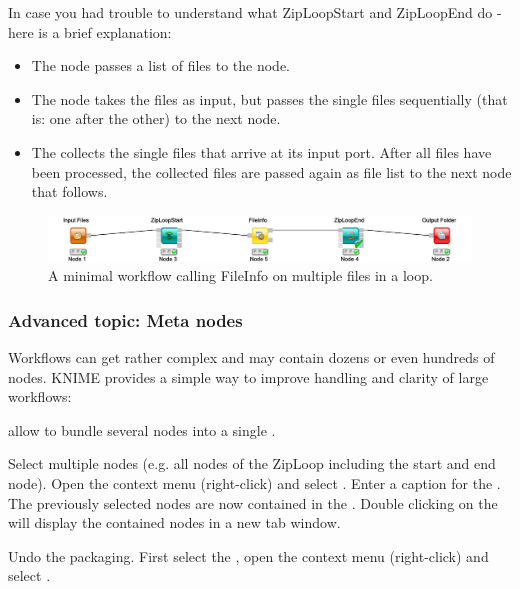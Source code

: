 In case you had trouble to understand what ZipLoopStart and ZipLoopEnd do - here is a brief explanation:
\begin{itemize}
\item
The   node passes a list of files to the  node.
\item
The  node takes the files as input, but passes the single files sequentially (that is: one after the other) to the next node. 
\item
The  collects the single files that arrive at its input port. After all files have been processed, the collected files are passed again as file list to the next node that follows.
\end{itemize}

\begin{figure}
\centering
\includegraphics[width=\textwidth]{graphics/knime_setup/Minimal_FileInfoLoop}
\caption{A minimal workflow calling FileInfo on multiple files in a loop.}
\label{fig:knime_minimal_loop}
\end{figure}

\subsubsection{Advanced topic: Meta nodes}

Workflows can get rather complex and may contain dozens or even hundreds of nodes. KNIME provides a simple way to improve handling and clarity of large workflows:

 allow to bundle several nodes into a single .

\begin{task}
Select multiple nodes (e.g. all nodes of the ZipLoop including the start and end node). Open the context menu (right-click) and select . Enter a caption for the . The previously selected nodes are now contained in the . Double clicking on the  will display the contained nodes in a new tab window. 
\end{task}

\begin{task}
Undo the packaging. First select the , open the context menu (right-click) and select .
\end{task}

